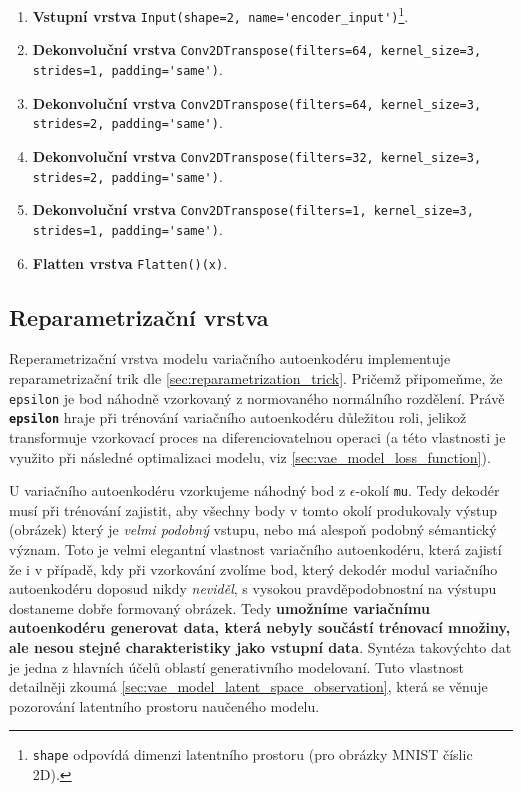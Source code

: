 \begin{enumerate}
    \item \textbf{Vstupní vrstva} \lstinline{Input(shape=2, name='encoder_input')}\footnote{\lstinline{shape} odpovídá dimenzi latentního prostoru (pro obrázky MNIST číslic 2D).}.
    \item \textbf{Dekonvoluční vrstva} \lstinline{Conv2DTranspose(filters=64, kernel_size=3, strides=1, padding='same')}.
    \item \textbf{Dekonvoluční vrstva} \lstinline{Conv2DTranspose(filters=64, kernel_size=3, strides=2, padding='same')}.
    \item \textbf{Dekonvoluční vrstva} \lstinline{Conv2DTranspose(filters=32, kernel_size=3, strides=2, padding='same')}.
    \item \textbf{Dekonvoluční vrstva} \lstinline{Conv2DTranspose(filters=1, kernel_size=3, strides=1, padding='same')}.
    \item \textbf{Flatten vrstva} \lstinline{Flatten()(x)}.
\end{enumerate}

\subsection{Reparametrizační vrstva}
\label{sec:vae_model_reparametrization_layer}
Reperametrizační vrstva modelu variačního autoenkodéru implementuje reparametrizační trik dle \autoref{sec:reparametrization_trick}.
Pričemž připomeňme, že \lstinline{epsilon} je bod náhodně vzorkovaný z normovaného normálního rozdělení.
Právě \textbf{\lstinline{epsilon}} hraje při trénování variačního autoenkodéru důležitou roli, jelikož transformuje vzorkovací proces na diferenciovatelnou operaci (a této vlastnosti je využito při následné optimalizaci modelu, viz \autoref{sec:vae_model_loss_function}).

U variačního autoenkodéru vzorkujeme náhodný bod z $\epsilon$-okolí \lstinline{mu}.
Tedy dekodér musí při trénování zajistit, aby všechny body v tomto okolí produkovaly výstup (obrázek) který je \emph{velmi podobný} vstupu, nebo má alespoň podobný sémantický význam.
Toto je velmi elegantní vlastnost variačního autoenkodéru, která zajistí že i v případě, kdy při vzorkování zvolíme bod, který dekodér modul variačního autoenkodéru doposud nikdy \emph{neviděl}, s vysokou pravděpodobnostní na výstupu dostaneme dobře formovaný obrázek.
Tedy \textbf{umožníme variačnímu autoenkodéru generovat data, která nebyly součástí trénovací množiny, ale nesou stejné charakteristiky jako vstupní data}. Syntéza takovýchto dat je jedna z hlavních účelů oblastí generativního modelovaní. Tuto vlastnost detailněji zkoumá \autoref{sec:vae_model_latent_space_observation}, která se věnuje pozorování latentního prostoru naučeného modelu.


